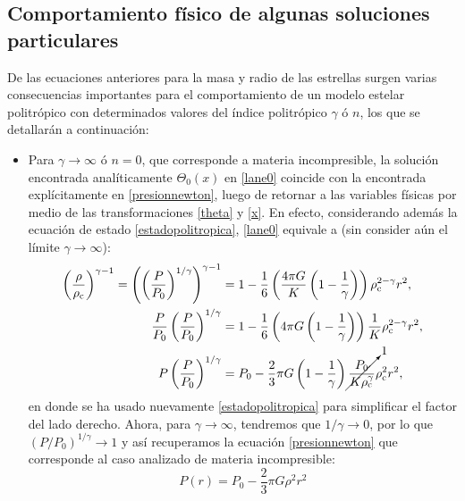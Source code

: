 \subsection{Comportamiento físico de algunas soluciones particulares}\label{sec:casos-lane-emden}

De las ecuaciones anteriores para la masa y radio de las estrellas surgen varias consecuencias importantes para el comportamiento de un modelo estelar politrópico con determinados valores del índice politrópico $\gamma$ ó $n$, los que se detallarán a continuación:

\begin{itemize}

\item Para $\gamma\to\infty$ ó $n=0$, que corresponde a materia incompresible, la solución encontrada analíticamente $\Theta_0(x)$ en \eqref{lane0} coincide con la encontrada explícitamente en \eqref{presionnewton}, luego de retornar a las variables físicas por medio de las transformaciones \eqref{theta} y \eqref{x}. En efecto, considerando además la ecuación de estado \eqref{estadopolitropica}, \eqref{lane0} equivale a (sin consider aún el límite $\gamma\to\infty$):
\begin{align}
 \left(\frac{\rho}{\rho_{\rm c}}\right)^{\gamma-1}=\left(\left(\frac{P}{P_0}\right)^{1/\gamma}\right)^{\gamma-1}&=1-\frac{1}{6}\left(\frac{4\pi G}{K}\left(1-\frac{1}{\gamma}\right)\right)\rho_{\rm c}^{2-\gamma}r^2,\\
\frac{P}{P_0}\left(\frac{P}{P_0}\right)^{1/\gamma}&=1-\frac{1}{6}\left(4\pi G\left(1-\frac{1}{\gamma}\right)\right)\frac{1}{K}\rho_{\rm c}^{2-\gamma}r^2,\\
P\left(\frac{P}{P_0}\right)^{1/\gamma}&=P_0-\frac{2}{3}\pi G\left(1-\frac{1}{\gamma}\right)\cancelto{1}{\frac{P_0}{K\rho_{\rm c}^{\gamma}}}\rho_{\rm c}^{2}r^2,
\end{align}
en donde se ha usado nuevamente \eqref{estadopolitropica} para simplificar el factor del lado derecho. Ahora,  para $\gamma\to\infty$, tendremos que $1/\gamma\to 0 $, por lo que $(P/P_0)^{1/\gamma}\to 1$ y así recuperamos la ecuación \eqref{presionnewton} que corresponde al caso analizado de materia incompresible:
\begin{equation}
 P(r)=P_0-\frac{2}{3}\pi G\rho^2r^2
\end{equation}



\end{itemize}
